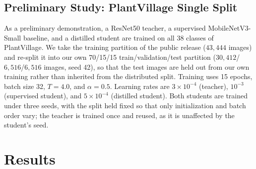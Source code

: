 \documentclass[conference]{IEEEtran}
\begin{document}
\begin{table}
  \centering
  \caption{Per-fold training configuration for the Cassava cross-validation
  study. All teachers are distilled into MobileNetV3-Small with $T=4.0$ and
  $\alpha=0.7$.}
  \label{tab:cv-config}
\end{table}

\subsection{Preliminary Study: PlantVillage Single Split}

As a preliminary demonstration, a ResNet50 teacher, a supervised
MobileNetV3-Small baseline, and a distilled student are trained on all 38
classes of PlantVillage. We take the training partition of the public release
($43{,}444$ images) and re-split it into our own 70/15/15
train/validation/test partition ($30{,}412$/$6{,}516$/$6{,}516$ images, seed
42), so that the test images are held out from our own training rather than
inherited from the distributed split. Training uses 15 epochs, batch size 32,
$T=4.0$, and $\alpha=0.5$. Learning rates are $3\times10^{-4}$ (teacher),
$10^{-3}$ (supervised student), and $5\times10^{-4}$ (distilled student).
Both students are trained under three seeds, with the split held fixed so that
only initialization and batch order vary; the teacher is trained once and reused,
as it is unaffected by the student's seed.

\section{Results}
\label{sec:results}
\end{document}
